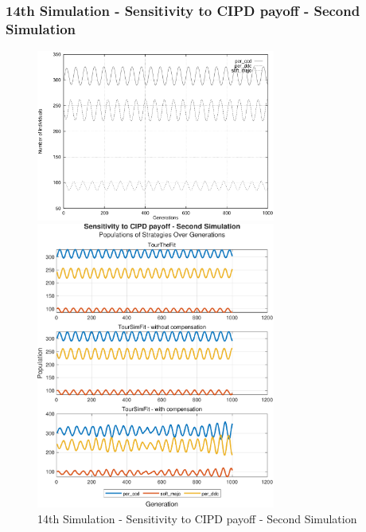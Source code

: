 \documentclass[12pt]{article}
\begin{document}
\subsubsection{14th Simulation - Sensitivity to CIPD payoff - Second Simulation}
	\begin{figure}[h]
	    \centering
		\includegraphics[width=0.7\textwidth]{RefPaperFigures/fig10b.jpeg}\par\vspace{0.5em}
	    \includegraphics[width=0.7\textwidth]{Sensitivity to CIPD payoff - Second Simulation.pdf}
	    \caption{14th Simulation - Sensitivity to CIPD payoff - Second Simulation}
	    \label{fig:Monotonous Convergence}
	\end{figure}
\end{document}
